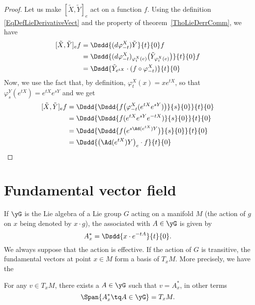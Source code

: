 \begin{proof}
	Let us make $[\tilde X,\tilde Y]_e$ act on a function $f$. Using the definition \eqref{EqDefLieDerivativeVect} and the property of theorem~\ref{ThoLieDerrComm}, we have
	\begin{equation}
		\begin{aligned}[]
			[\tilde X,\tilde Y]_ef&=\Dsdd{ (d\varphi_{-t}^X)\tilde Y }{t}{0}f\\
			&=\Dsdd{ (d\varphi_{-t}^X)_{\varphi_t^X(e)}\big( \tilde Y_{\varphi_t^X(e)} \big) }{t}{0}f\\
			&=\Dsdd{ \tilde Y_{ e^{tX}}\cdot(f\circ\varphi_{-t}^X) }{t}{0}
		\end{aligned}
	\end{equation}
	Now, we use the fact that, by definition, $\varphi_t^X(x)=x e^{tX}$, so that $\varphi_s^Y( e^{tX})= e^{tX} e^{sY}$ and we get
	\begin{equation}
		\begin{aligned}[]
			[\tilde X,\tilde Y]_ef&=\Dsdd{ \Dsdd{ f\big( \varphi_{-t}^X( e^{tX} e^{sY}) \big) }{s}{0} }{t}{0}\\
			&=\Dsdd { \Dsdd{ f( e^{tX} e^{sY} e^{-tX}) }{s}{0} } {t}{0}\\
			&=\Dsdd{ \Dsdd{ f\big(  e^{s\Ad( e^{tX})Y} \big) }{s}{0} }{t}{0}\\
			&=\Dsdd{ \big( \Ad( e^{tX})Y \big)_e\cdot f }{t}{0}
		\end{aligned}
	\end{equation}

\end{proof}


\section{Fundamental vector field}\label{sec:fond_vec}

If $\yG$ is the Lie algebra of a Lie group $G$ acting on a manifold $M$ (the action of $g$ on $x$ being denoted by $x\cdot g$), the  associated with $A\in\yG$ is given by
\begin{equation}			\label{EqDefChmpFond}
   A^*_x=\Dsdd{ x\cdot e^{-tA} }{t}{0}.
\end{equation}
We always suppose that the action is effective. If the action of $G$ is transitive, the fundamental vectors at point $x\in M$ form a basis of $T_xM$. More precisely, we have the

\begin{lemma}
For any $v\in T_xM$, there exists a $A\in\yG$ such that $v=A^*_x$, in other terms
\[
  \Span\{ A^*_{x}\tq A\in\yG \}=T_{x}M.
\]
\label{LemFundSpansTan}
\end{lemma}

